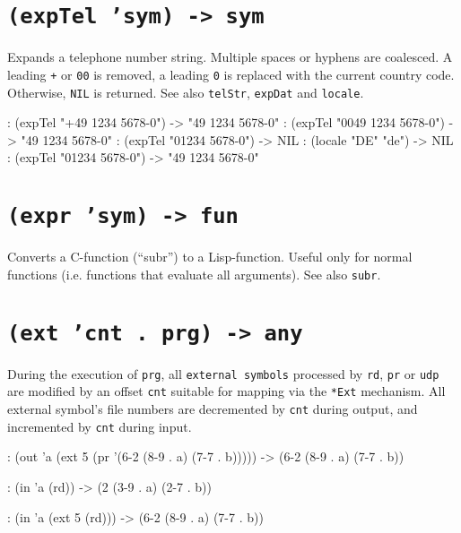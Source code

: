  
\section*{\texttt{(expTel 'sym) -> sym}}
\label{sec:func-ref-E-(expTel 'sym) -> sym}


Expands a telephone number string. Multiple spaces or hyphens are
coalesced. A leading \texttt{+} or \texttt{00} is removed, a leading \texttt{0} is replaced
with the current country code. Otherwise, \texttt{NIL} is returned. See also
\texttt{telStr}, \texttt{expDat} and \texttt{locale}.


\begin{wideverbatim}
: (expTel "+49 1234 5678-0")
-> "49 1234 5678-0"
: (expTel "0049 1234 5678-0")
-> "49 1234 5678-0"
: (expTel "01234 5678-0")
-> NIL
: (locale "DE" "de")
-> NIL
: (expTel "01234 5678-0")
-> "49 1234 5678-0"
\end{wideverbatim}

 
\section*{\texttt{(expr 'sym) -> fun}}
\label{sec:func-ref-E-(expr 'sym) -> fun}


Converts a C-function (``subr'') to a Lisp-function. Useful only for
normal functions (i.e. functions that evaluate all arguments). See also
\texttt{subr}.



 
\section*{\texttt{(ext 'cnt . prg) -> any}}
\label{sec:func-ref-E-(ext 'cnt . prg) -> any}


During the execution of \texttt{prg}, all \texttt{external symbols} processed by \texttt{rd},
\texttt{pr} or \texttt{udp} are modified by an offset \texttt{cnt} suitable for mapping via
the \texttt{*Ext} mechanism. All external symbol's file numbers are decremented
by \texttt{cnt} during output, and incremented by \texttt{cnt} during input.


\begin{wideverbatim}
: (out 'a (ext 5 (pr '({6-2} ({8-9} . a) ({7-7} . b)))))
-> ({6-2} ({8-9} . a) ({7-7} . b))

: (in 'a (rd))
-> ({2} ({3-9} . a) ({2-7} . b))

: (in 'a (ext 5 (rd)))
-> ({6-2} ({8-9} . a) ({7-7} . b))
\end{wideverbatim}

